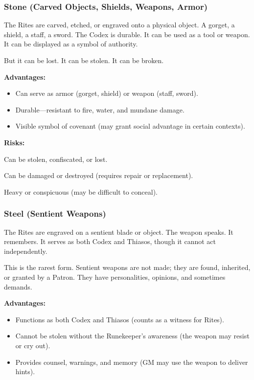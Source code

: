 \subsubsection{Stone (Carved Objects, Shields, Weapons, Armor)}

The Rites are carved, etched, or engraved onto a physical object. A gorget, a shield, a staff, a sword. The Codex is durable. It can be used as a tool or weapon. It can be displayed as a symbol of authority.

But it can be lost. It can be stolen. It can be broken.

\textbf{Advantages:}
\begin{itemize}
\item Can serve as armor (gorget, shield) or weapon (staff, sword).
\item Durable—resistant to fire, water, and mundane damage.
\item Visible symbol of covenant (may grant social advantage in certain contexts).
\end{itemize}

\textbf{Risks:}
\item Can be stolen, confiscated, or lost.
\item Can be damaged or destroyed (requires repair or replacement).
\item Heavy or conspicuous (may be difficult to conceal).

\subsubsection{Steel (Sentient Weapons)}

The Rites are engraved on a sentient blade or object. The weapon speaks. It remembers. It serves as both Codex and Thiasos, though it cannot act independently.

This is the rarest form. Sentient weapons are not made; they are found, inherited, or granted by a Patron. They have personalities, opinions, and sometimes demands.

\textbf{Advantages:}
\begin{itemize}
\item Functions as both Codex and Thiasos (counts as a witness for Rites).
\item Cannot be stolen without the Runekeeper's awareness (the weapon may resist or cry out).
\item Provides counsel, warnings, and memory (GM may use the weapon to deliver hints).
\end{itemize}

